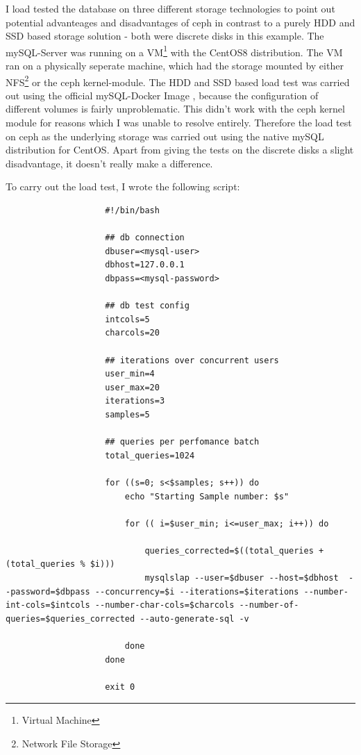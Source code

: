 \documentclass[titlepage, a4paper, 11pt]{scrartcl}
\begin{document}
                I load tested the database on three different storage technologies to point out potential advanteages and disadvantages of ceph in contrast to a purely HDD and SSD based storage solution - both were discrete disks in this example. The mySQL-Server was running on a VM\footnote{Virtual Machine} with the CentOS8 distribution.
                The VM ran on a physically seperate machine, which had the storage mounted by either NFS\footnote{Network File Storage} or the ceph kernel-module. The HDD and SSD based load test was carried out using the official mySQL-Docker Image \cite{mysqlDockerHub}, because the configuration of different volumes is fairly unproblematic. This didn't work with the ceph kernel module for reasons which I was unable to resolve entirely. Therefore the load test on ceph as the underlying storage was carried out using the native mySQL distribution for CentOS. Apart from giving the tests on the discrete disks a slight disadvantage, it doesn't really make a difference.

                To carry out the load test, I wrote the following script:

                \begin{lstlisting}
                    #!/bin/bash

                    ## db connection
                    dbuser=<mysql-user>
                    dbhost=127.0.0.1
                    dbpass=<mysql-password>

                    ## db test config
                    intcols=5
                    charcols=20

                    ## iterations over concurrent users
                    user_min=4
                    user_max=20
                    iterations=3
                    samples=5

                    ## queries per perfomance batch
                    total_queries=1024

                    for ((s=0; s<$samples; s++)) do
                        echo "Starting Sample number: $s"

                        for (( i=$user_min; i<=user_max; i++)) do
                            
                            queries_corrected=$((total_queries + (total_queries % $i)))
                            mysqlslap --user=$dbuser --host=$dbhost  --password=$dbpass --concurrency=$i --iterations=$iterations --number-int-cols=$intcols --number-char-cols=$charcols --number-of-queries=$queries_corrected --auto-generate-sql -v

                        done
                    done

                    exit 0
                \end{lstlisting}
\end{document}
